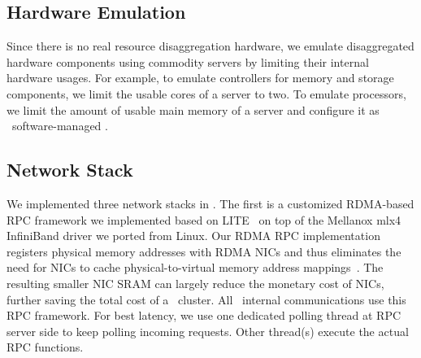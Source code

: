 \documentclass[10pt,times,twocolumn]{z2-article}
\begin{document}
{{{{{{{%




\subsection{Hardware Emulation}
Since there is no real resource disaggregation hardware,
we emulate disaggregated hardware components using commodity servers 
by limiting their internal hardware usages.
For example, to emulate controllers for memory and storage components, 
we limit the usable cores of a server to two.
To emulate processors, we limit the amount of usable main memory of a server
and configure it as \lego\ software-managed \excache.


\subsection{Network Stack}
We implemented three network stacks in \lego.
The first is a customized RDMA-based RPC framework we implemented based on LITE~\cite{Tsai17-SOSP}
on top of the Mellanox mlx4 InfiniBand driver we ported from Linux.
Our RDMA RPC implementation registers physical memory addresses with RDMA NICs 
and thus eliminates the need for NICs to cache physical-to-virtual memory address mappings~\cite{Tsai17-SOSP}.
The resulting smaller NIC SRAM can largely reduce the monetary cost of NICs,
further saving the total cost of a \lego\ cluster. %
All \lego\ internal communications use this RPC framework.
For best latency, we use one dedicated polling thread at RPC server side to keep polling incoming requests.
Other thread(s) execute the actual RPC functions. 

}}}}}}}
\end{document}

